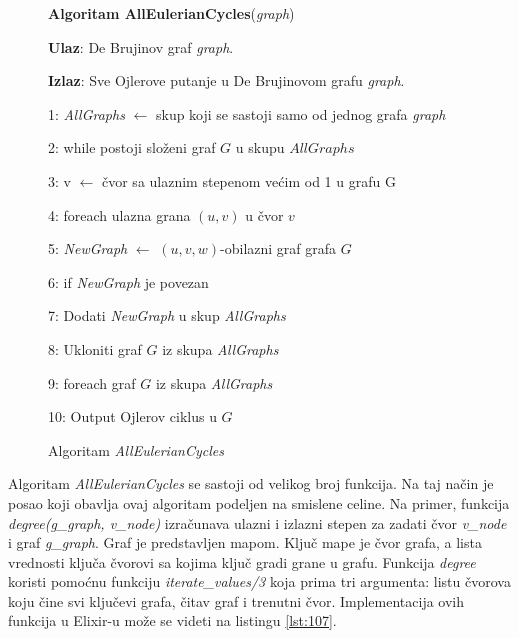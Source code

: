 \documentclass[12pt,oneside]{memoir}
\begin{document}
\begin{figure}[!ht]
\begin{tcolorbox}
\textbf{Algoritam AllEulerianCycles}(\textit{graph})

\textbf{Ulaz}:  De Brujinov graf \textit{graph}.

\textbf{Izlaz}: Sve Ojlerove putanje u De Brujinovom grafu \textit{graph}.

1: \textit{AllGraphs} $\longleftarrow$ skup koji se sastoji samo od jednog grafa \textit{graph}

2: while postoji složeni graf $G$ u skupu $AllGraphs$

3:\hspace{1cm} v $\longleftarrow$ čvor sa ulaznim stepenom većim od 1 u grafu G

4:\hspace{1cm} foreach ulazna grana $(u, v)$ u čvor $v$
    
5:\hspace{2cm} \textit{NewGraph} $\longleftarrow$ $(u, v, w)$-obilazni graf grafa $G$

6:\hspace{2cm} if \textit{NewGraph} je povezan

7:\hspace{3cm} Dodati \textit{NewGraph} u skup \textit{AllGraphs}

8:\hspace{1cm} Ukloniti graf $G$ iz skupa \textit{AllGraphs}

9: foreach graf $G$ iz skupa \textit{AllGraphs}

10:\hspace{1cm} Output Ojlerov ciklus u $G$
\end{tcolorbox}
\caption{Algoritam \textit{AllEulerianCycles} \cite{bioinformaticsAlg}}
\label{box:allEulerianCycles}
\end{figure}

Algoritam \textit{AllEulerianCycles} se sastoji od velikog broj funkcija. Na taj način je posao koji obavlja ovaj algoritam podeljen na smislene celine. Na primer, funkcija \textit{degree(g\_graph, v\_node)} izračunava ulazni i izlazni stepen za zadati čvor \textit{v\_node} i graf \textit{g\_graph}. Graf je predstavljen mapom. Ključ mape je čvor grafa, a lista vrednosti ključa čvorovi sa kojima ključ gradi grane u grafu. Funkcija \textit{degree} koristi pomoćnu funkciju \textit{iterate\_values/3} koja  prima tri argumenta: listu čvorova koju čine svi ključevi grafa, čitav graf i trenutni čvor. Implementacija ovih funkcija u Elixir-u može se videti na listingu \ref{lst:107}.
\end{document}
